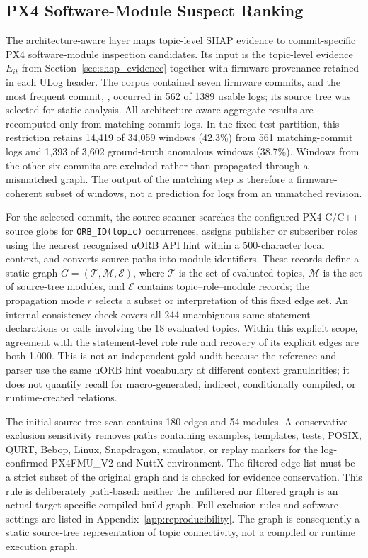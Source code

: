 \subsection{PX4 Software-Module Suspect Ranking}
\label{sec:module_ranking}

The architecture-aware layer maps topic-level SHAP evidence to commit-specific PX4 software-module inspection candidates. Its input is the topic-level evidence $E_{it}$ from Section~\ref{sec:shap_evidence} together with firmware provenance retained in each ULog header. The corpus contained seven firmware commits, and the most frequent commit, \texttt{}, occurred in 562 of 1389 usable logs; its source tree was selected for static analysis. All architecture-aware aggregate results are recomputed only from matching-commit logs. In the fixed test partition, this restriction retains 14,419 of 34,059 windows (42.3\%) from 561 matching-commit logs and 1,393 of 3,602 ground-truth anomalous windows (38.7\%). Windows from the other six commits are excluded rather than propagated through a mismatched graph. The output of the matching step is therefore a firmware-coherent subset of windows, not a prediction for logs from an unmatched revision.

For the selected commit, the source scanner searches the configured PX4 C/C++ source globs for \texttt{ORB\_ID(topic)} occurrences, assigns publisher or subscriber roles using the nearest recognized uORB API hint within a 500-character local context, and converts source paths into module identifiers. These records define a static graph $G=(\mathcal{T},\mathcal{M},\mathcal{E})$, where $\mathcal{T}$ is the set of evaluated topics, $\mathcal{M}$ is the set of source-tree modules, and $\mathcal{E}$ contains topic--role--module records; the propagation mode $r$ selects a subset or interpretation of this fixed edge set. An internal consistency check covers all 244 unambiguous same-statement declarations or calls involving the 18 evaluated topics. Within this explicit scope, agreement with the statement-level role rule and recovery of its explicit edges are both 1.000. This is not an independent gold audit because the reference and parser use the same uORB hint vocabulary at different context granularities; it does not quantify recall for macro-generated, indirect, conditionally compiled, or runtime-created relations.

The initial source-tree scan contains 180 edges and 54 modules. A conservative-exclusion sensitivity removes paths containing examples, templates, tests, POSIX, QURT, Bebop, Linux, Snapdragon, simulator, or replay markers for the log-confirmed PX4FMU\_V2 and NuttX environment. The filtered edge list must be a strict subset of the original graph and is checked for evidence conservation. This rule is deliberately path-based: neither the unfiltered nor filtered graph is an actual target-specific compiled build graph. Full exclusion rules and software settings are listed in Appendix~\ref{app:reproducibility}. The graph is consequently a static source-tree representation of topic connectivity, not a compiled or runtime execution graph.

